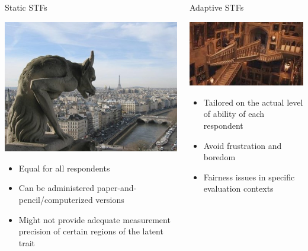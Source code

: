 \documentclass[aspectratio=149, compress]{beamer}
\begin{document}
\begin{frame}
	
\begin{columns}[T]
	\begin{column}{.50\linewidth}
	\centering
	Static STFs
	
	\vspace{2.5mm}
	\includegraphics[width=.70\linewidth]{img/garg}	
	
	\begin{itemize}
		\small
		\color{myGreen}
		\item Equal for all respondents 
		\item Can be administered paper-and-pencil/computerized versions
		\color{unipd}
		\item Might not provide adequate measurement precision of certain regions of the latent trait
	\end{itemize}
	\end{column}
	\begin{column}{.50\linewidth}
		\centering
		Adaptive STFs
	
	\vspace{2.5mm}
		\centering
	\includegraphics[width=.80\linewidth]{img/scale}	
	\begin{itemize}
		\small
		\color{myGreen}
		\item Tailored on the actual level of ability of each respondent
		\item Avoid frustration and boredom 
		\color{unipd}
		\item Fairness issues in specific evaluation contexts
	\end{itemize}
	
\end{column}

\end{columns}


\end{frame}
\end{document}
